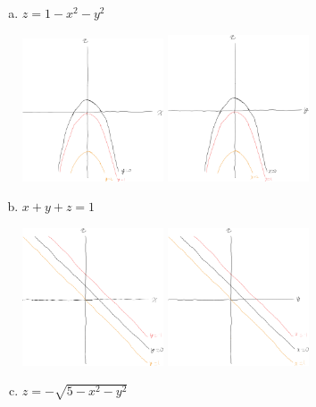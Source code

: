 \documentclass[9pt]{extarticle}
\begin{document}
\begin{problem}{12.2}
\begin{itemize}
\begin{enumerate}[(a)]
\begin{center}
            \end{center}
          \item $z = 1-x^2-y^2$
            \begin{center}
            \includegraphics[width=0.33\textwidth]{12_2_30_b_1}
            \includegraphics[width=0.33\textwidth]{12_2_30_b_2}
            \end{center}
          \item $x+y+z = 1$
            \begin{center}
            \includegraphics[width=0.33\textwidth]{12_2_30_c_1}
            \includegraphics[width=0.33\textwidth]{12_2_30_c_2}
            \end{center}
          \item $z = -\sqrt{5-x^2-y^2}$

\end{enumerate}
\end{itemize}
\end{problem}
\end{document}
